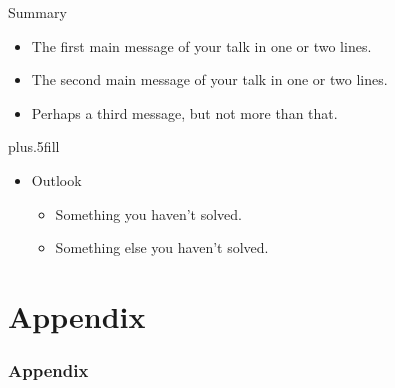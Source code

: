 \documentclass[
aspectratio=169,
11pt,
c,
compress,
hyperref={
  colorlinks=false,
}]{beamer}
\begin{document}
\begin{frame}{Summary}

  \begin{itemize}
    \item
          The \alert{first main message} of your talk in one or two lines.
    \item
          The \alert{second main message} of your talk in one or two lines.
    \item
          Perhaps a \alert{third message}, but not more than that.
  \end{itemize}

  \vskip0pt plus.5fill
  \begin{itemize}
    \item
          Outlook
          \begin{itemize}
            \item
                  Something you haven't solved.
            \item
                  Something else you haven't solved.
          \end{itemize}
  \end{itemize}
\end{frame}

\appendix
\section*{Appendix}

\begin{frame}[c]
  \frametitle{Appendix}

\end{frame}
\end{document}
